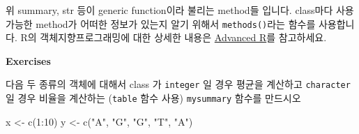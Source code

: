 \documentclass[
]{book}
\newenvironment{Shaded}{\begin{snugshade}}{\end{snugshade}}
\newcommand{\AttributeTok}[1]{\textcolor[rgb]{0.77,0.63,0.00}{#1}}
\newcommand{\DecValTok}[1]{\textcolor[rgb]{0.00,0.00,0.81}{#1}}
\newcommand{\FunctionTok}[1]{\textcolor[rgb]{0.00,0.00,0.00}{#1}}
\newcommand{\NormalTok}[1]{#1}
\newcommand{\OtherTok}[1]{\textcolor[rgb]{0.56,0.35,0.01}{#1}}
\newcommand{\SpecialCharTok}[1]{\textcolor[rgb]{0.00,0.00,0.00}{#1}}
\newcommand{\StringTok}[1]{\textcolor[rgb]{0.31,0.60,0.02}{#1}}
\begin{document}
\begin{Shaded}
\end{Shaded}

위 summary, str 등이 generic function이라 불리는 method들 입니다. class마다 사용 가능한 method가 어떠한 정보가 있는지 알기 위해서 \texttt{methods()}라는 함수를 사용합니다. R의 객체지향프로그래밍에 대한 상세한 내용은 \href{https://adv-r.hadley.nz/s3.html}{Advanced R}를 참고하세요.

\textbf{Exercises }

다음 두 종류의 객체에 대해서 class 가 \texttt{integer} 일 경우 평균을 계산하고 \texttt{character}일 경우 비율을 계산하는 (\texttt{table} 함수 사용) \texttt{mysummary} 함수를 만드시오

\begin{Shaded}
\begin{Highlighting}[]

\NormalTok{x }\OtherTok{\textless{}{-}} \FunctionTok{c}\NormalTok{(}\DecValTok{1}\SpecialCharTok{:}\DecValTok{10}\NormalTok{)}
\NormalTok{y }\OtherTok{\textless{}{-}} \FunctionTok{c}\NormalTok{(}\StringTok{"A"}\NormalTok{, }\StringTok{"G"}\NormalTok{, }\StringTok{"G"}\NormalTok{, }\StringTok{"T"}\NormalTok{, }\StringTok{"A"}\NormalTok{)}
\end{Highlighting}
\end{Shaded}
\end{document}
